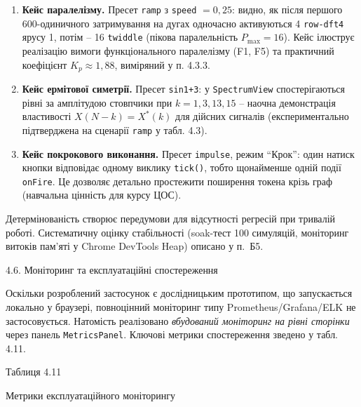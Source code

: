 \documentclass[
]{article}
\newcommand{\passthrough}[1]{#1}
\begin{document}
\begin{enumerate}
\def\labelenumi{\arabic{enumi})}
\item
  \textbf{Кейс паралелізму.} Пресет \passthrough{\lstinline!ramp!} з
  \passthrough{\lstinline!speed!} \(= 0,25\): видно, як після першого
  600-одиничного затримування на дугах одночасно активуються 4
  \passthrough{\lstinline!row!}\passthrough{\lstinline!-!}\passthrough{\lstinline!dft!}\passthrough{\lstinline!4!}
  ярусу 1, потім -- 16 \passthrough{\lstinline!twiddle!} (пікова
  паралельність \(P_{\max} = 16\)). Кейс ілюструє реалізацію вимоги
  функціонального паралелізму (F1, F5) та практичний коефіцієнт
  \(K_{p} \approx 1,88\), виміряний у п. 4.3.3.
\item
  \textbf{Кейс ермітової симетрії.} Пресет
  \passthrough{\lstinline!sin!}\passthrough{\lstinline!1+3!}: у
  \passthrough{\lstinline!SpectrumView!} спостерігаються рівні за
  амплітудою стовпчики при \(k = 1,3,13,15\) -- наочна демонстрація
  властивості \(X(N - k) = X^{*}(k)\) для дійсних сигналів
  (експериментально підтверджена на сценарії
  \passthrough{\lstinline!ramp!} у табл. 4.3).
\item
  \textbf{Кейс покрокового виконання.} Пресет
  \passthrough{\lstinline!impulse!}, режим ``Крок'': один натиск кнопки
  відповідає одному виклику
  \passthrough{\lstinline!tick!}\passthrough{\lstinline!()!}, тобто
  щонайменше одній події \passthrough{\lstinline!onFire!}. Це дозволяє
  детально простежити поширення токена крізь граф (навчальна цінність
  для курсу ЦОС).
\end{enumerate}

Детермінованість створює передумови для відсутності регресій при
тривалій роботі. Систематичну оцінку стабільності (soak-тест 100
симуляцій, моніторинг витоків пам'яті у Chrome DevTools Heap) описано у
п.~Б5.

\protect{}\label{Xddcc2d41e218d4eab0104affeeaeb116ef3d72e}{}4.6.
Моніторинг та експлуатаційні спостереження

Оскільки розроблений застосунок є дослідницьким прототипом, що
запускається локально у браузері, повноцінний моніторинг типу
Prometheus/Grafana/ELK не застосовується. Натомість реалізовано
\emph{вбудований моніторинг на рівні сторінки} через панель
\passthrough{\lstinline!MetricsPanel!}. Ключові метрики спостереження
зведено у табл. 4.11.

Таблиця 4.11

Метрики експлуатаційного моніторингу
\end{document}
